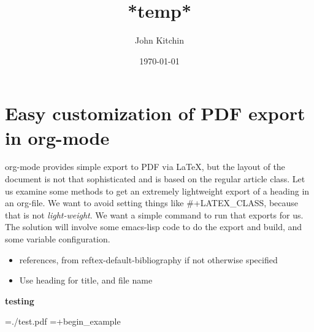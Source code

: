 \documentclass[12pt]{article}
\author{John Kitchin}
\date{\today}
\title{ *temp*}
\providecommand{\alert}[1]{\textbf{#1}}
\begin{document}
\maketitle
\tableofcontents

\section{Easy customization of PDF export in org-mode}
\label{sec-1}

org-mode provides simple export to PDF via \LaTeX{}, but the layout of the document is not that sophisticated and is based on the regular article class. Let us examine some methods to get an extremely lightweight export of a heading in an org-file. We want to avoid setting things like \#+LATEX\_CLASS, because that is not \emph{light-weight}. We want a simple command to run that exports for us. The solution will involve some emacs-lisp code to do the export and build, and some variable configuration.

\begin{itemize}
\item references, from reftex-default-bibliography if not otherwise specified
\item Use heading for title, and file name
\end{itemize}


\alert{testing}

=./test.pdf
=+begin\_example
\end{document}
